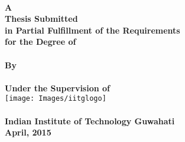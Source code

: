 \documentclass[11pt, a4paper, twoside]{Thesis} %
\begin{document}
\begin{titlepage}
\begin{center}

{\bfseries \fontsize{18}{19}\selectfont{\thesisTitle}}\\[1.5cm]


\large \textbf{A} \\ \textbf{Thesis Submitted} \\ \textbf{in Partial Fulfillment of the Requirements} \\ \textbf{for the Degree of} \\ \textbf{\expandafter\uppercase\expandafter{\degreeName}} \\ \textbf{By} \\ [1.5cm] \textbf{\expandafter\uppercase\expandafter{\authorName}}\\  \textbf{Under the Supervision of \supervisorTitle \ \expandafter\uppercase\expandafter{\supervisorName}} \\[1.5cm] %



\texttt{[image: Images/iitglogo]} \\ [3cm]



\large \textbf{\departmentName} \\ \textbf{Indian Institute of Technology Guwahati} \\  \textbf{April, 2015}\\ [0.3cm]


\end{center}



\end{titlepage}


\clearpage %

\pagestyle{empty} %
\end{document}
